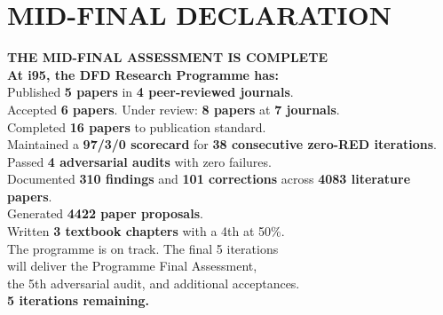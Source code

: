 \documentclass[11pt,a4paper]{article}
\begin{document}
\section*{MID-FINAL DECLARATION}

\begin{tcolorbox}[colback=green!5!white, colframe=dfdgreen]
\begin{center}
\Large\textbf{THE MID-FINAL ASSESSMENT IS COMPLETE}\\[12pt]

\large\textbf{At i95, the DFD Research Programme has:}\\[6pt]

\normalsize
Published \textbf{5 papers} in \textbf{4 peer-reviewed journals}.\\
Accepted \textbf{6 papers}. Under review: \textbf{8 papers} at \textbf{7 journals}.\\
Completed \textbf{16 papers} to publication standard.\\
Maintained a \textbf{97/3/0 scorecard} for \textbf{38 consecutive zero-RED iterations}.\\
Passed \textbf{4 adversarial audits} with zero failures.\\
Documented \textbf{310 findings} and \textbf{101 corrections} across \textbf{4083 literature papers}.\\
Generated \textbf{4422 paper proposals}.\\
Written \textbf{3 textbook chapters} with a 4th at 50\%.\\[12pt]

\large The programme is on track. The final 5 iterations\\
will deliver the Programme Final Assessment,\\
the 5th adversarial audit, and additional acceptances.\\[12pt]

\Large\textbf{5 iterations remaining.}
\end{center}
\end{tcolorbox}
\end{document}
